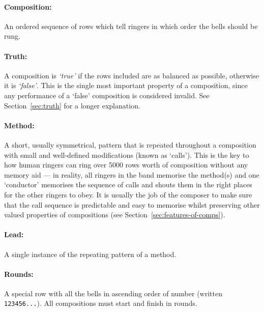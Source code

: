 \documentclass[12pt]{article}
\begin{document}
\paragraph{Composition:} An ordered sequence of rows which tell ringers in which order the bells
should be rung.

\paragraph{Truth:} A composition is \emph{`true'} if the rows included are as balanced as possible,
otherwise it is \emph{`false'}.  This is the single most important property of a
composition, since any performance of a `false' composition is considered invalid.  See
Section~\ref{sec:truth} for a longer explanation.

\paragraph{Method:} A short, usually symmetrical, pattern that is repeated throughout a composition
with small and well-defined modifications (known as `calls').  This is the key to how human ringers
can ring over 5000 rows worth of composition without any memory aid --- in reality, all ringers in
the band memorise
the method(s) and one `conductor' memorises the sequence of calls and shouts them in the right places
for the other ringers to obey.  It is usually the job of the composer to make sure that the call
sequence is predictable and easy to memorise whilst preserving other valued properties of
compositions (see Section~\ref{sec:features-of-comps}).

\paragraph{Lead:} A single instance of the repeating pattern of a method.

\paragraph{Rounds:} A special row with all the bells in ascending order of number (written
\verb|123456...|).  All compositions must start and finish in rounds.
\end{document}
